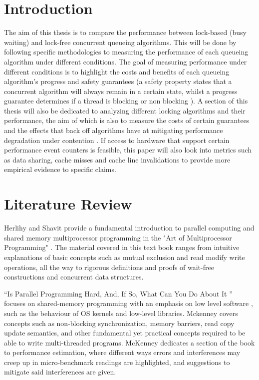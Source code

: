 \documentclass[a4paper, 12pt, titlepage]{article}
\begin{document}
\section{Introduction}
\begin{onehalfspacing}
The aim of this thesis is to compare the performance between lock-based (busy waiting) \cite{anderson1990performance, herlihy2020art,graunke1990synchronization} and lock-free \cite{herlihy2020art,valois1995lock} concurrent queueing algorithms. This will be done by following specific methodologies to measuring the performance of each queueing algorithm under different conditions. The goal of measuring performance under different conditions is to highlight the costs and benefits of each queueing algorithm's progress and safety guarantees (a safety property states that a concurrent algorithm will always remain in a certain state, whilst a progress guarantee determines if a thread is blocking or non blocking \cite{herlihy2020art,mckenney2017parallel}). A section of this thesis will also be dedicated to analyzing different locking algorithms and their performance, the aim of which is also to measure the costs of certain guarantees and the effects that back off algorithms have at mitigating performance degradation under contention \cite{anderson1990performance,graunke1990synchronization,valois1994implementing}. If access to hardware that support certain performance event counters is feasible, this paper will also look into metrics such as data sharing, cache misses and cache line invalidations\cite{intelmanual,intelmanualoptimization,sahelices2009methodology}  to provide more empirical evidence to specific claims.

\section{Literature Review}
Herlihy and Shavit provide a fundamental introduction to parallel computing and shared memory multiprocessor programming in the "Art of Multiprocessor Programming" \cite{herlihy2020art}. The material covered in this text book ranges from intuitive explanations of basic concepts such as mutual exclusion and read modify write operations, all the way to rigorous definitions and proofs of wait-free constructions and concurrent data structures.

``Is Parallel Programming Hard, And, If So, What Can You Do About It '' focuses on shared-memory programming with an emphasis on low level software \cite{mckenney2017parallel}, such as the behaviour of OS kernels and low-level libraries. Mckenney covers concepts such as non-blocking synchronization, memory barriers, read copy update semantics, and other fundamental yet practical concepts required to be able to write multi-threaded programs. McKenney dedicates a section of the book to performance estimation, where different ways errors and interferences may creep up in micro-benchmark readings are highlighted, and suggestions to mitigate said interferences are given.


\end{onehalfspacing}
\end{document}
